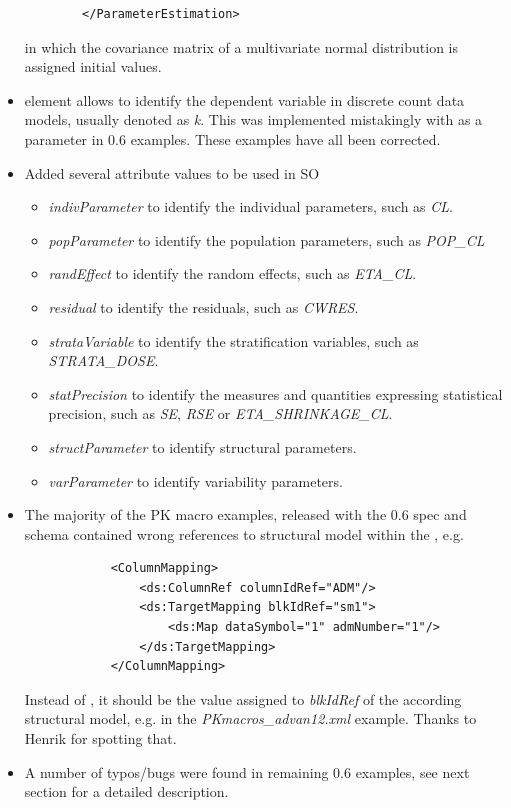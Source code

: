 \begin{itemize}
\begin{lstlisting}
        </ParameterEstimation>
\end{lstlisting}
in which the covariance matrix of a multivariate normal distribution
is assigned initial values.
\item 
{} element allows to identify the dependent variable 
in discrete count data models, usually denoted as \emph{k}. This was implemented
mistakingly with as a parameter in 0.6 examples. These examples have all
been corrected.
\item 
Added several  attribute values to be used in SO
\begin{itemize}
\item
\emph{indivParameter} to identify the individual parameters, such as \emph{CL}.
\item
\emph{popParameter} to identify the population parameters, such as \emph{POP\_CL}
\item
\emph{randEffect} to identify the random effects, such as \emph{ETA\_CL}.
\item
\emph{residual} to identify the residuals, such as \emph{CWRES}.
\item
\emph{strataVariable} to identify the stratification variables, such as \emph{STRATA\_DOSE}.
\item
\emph{statPrecision} to identify the measures and quantities expressing
statistical precision, such as \emph{SE}, \emph{RSE} or \emph{ETA\_SHRINKAGE\_CL}.
\item
\emph{structParameter} to identify structural parameters.
\item
\emph{varParameter} to identify variability parameters.
\end{itemize}
\end{itemize}

\begin{itemize}
\item 
The majority of the PK macro examples, released with the 0.6 spec and schema 
contained wrong references to structural model within the , e.g.
\lstset{language=XML}
\begin{lstlisting}
            <ColumnMapping>
                <ds:ColumnRef columnIdRef="ADM"/>
                <ds:TargetMapping blkIdRef="sm1">
                    <ds:Map dataSymbol="1" admNumber="1"/>
                </ds:TargetMapping>
            </ColumnMapping>
\end{lstlisting}
Instead of , it should be the value assigned to \emph{blkIdRef} of the 
according structural model, e.g.  in the \emph{PKmacros\_advan12.xml} 
example. Thanks to Henrik for spotting that.
\item
A number of typos/bugs were found in remaining 0.6 examples, see next section for
a detailed description.
\end{itemize}


